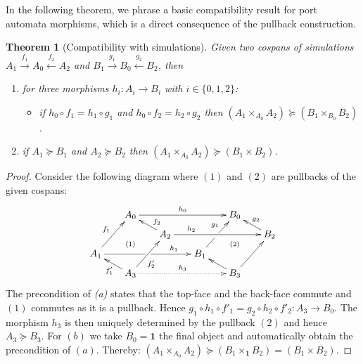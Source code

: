 \documentclass[copyright,creativecommons]{eptcs}
\newtheorem{theorem}{Theorem}
\newcommand{\one}{\ensuremath{\mathbf{1}}}
\begin{document}
In the following theorem, we phrase a basic compatibility result for port
automata morphisms, which is a direct consequence of the pullback construction.
\begin{theorem}[Compatibility with simulations]
Given two cospans of simulations $A_1 \overset{f_1}{\longrightarrow} A_0
\overset{f_2}{\longleftarrow} A_2$ and 
$B_1 \overset{g_1}{\longrightarrow} B_0 \overset{g_2}{\longleftarrow} B_2$,
then
\begin{enumerate}
  \item for three morphisms $h_i: A_i \to B_i$ with $i\in \{0,1,2\}$:
  \vspace{2mm}
  \begin{itemize} 
    \item if $h_0 \circ f_1 = h_1 \circ g_1$ and $h_0 \circ f_2 = h_2 \circ
    g_2$ then $\left( A_1 \times_{A_0} A_2 \right) \succeq \left( B_1
    \times_{B_0} B_2 \right)$.
  \end{itemize} 
  \vspace{2mm}
  \item if $A_1 \succeq B_1$ and $A_2 \succeq B_2$ then 
  $\left( A_1 \times_{A_0} A_2 \right) \succeq \left( B_1 \times B_2
  \right)$.
\end{enumerate}
\end{theorem}
\begin{proof}
Consider the following diagram where $(1)$ and $(2)$ are pullbacks of the given
cospans:
\vspace{-3mm}
\[
\xymatrix @C2mm @R2mm {
  && 
  A_0 \ar[rrrrrr]^{h_0} 
      &&&&&& 
  B_0 \\
      &&&&
  A_2 \ar[rrrrrr]^(0.25){h_2} 
      \ar[ull]_(.35){f_2} 
      \ar@{}[dllll]|{(1)} 
      &&&&&& 
  B_2 \ar[ull]_{g_2} 
      \ar@{}[dllll]|{(2)} 
      \\ 
  A_1 \ar'[rrr][rrrrrr]^(.5){h_1} 
      \ar[uurr]^{f_1} 
      &&&&&& 
  B_1 \ar'[ur][uurr] ^(.25){g_1} 
      \\ 
      && 
  A_3 \ar[uurr]_(.4){f_{2}'} 
      \ar@{.>}[rrrrrr]^{h_3} 
      \ar[ull]^{f_{1}'} 
      &&&&&& 
  B_3 \ar[ull] 
      \ar[uurr] 
      \\
}
\]
The precondition of \emph{(a)} states that the top-face and the back-face 
commute and $(1)$ commutes as it is a pullback. Hence $g_1 \circ h_1 \circ
f'_1 = g_2 \circ h_2 \circ f'_2 : A_3 \to B_0$. The morphism $h_3$ is then
uniquely determined by the pullback $(2)$ and hence $A_3 \succeq B_3$. 
For $(b)$ we take $B_0=\one$ the final object and automatically obtain
the precondition of $(a)$. Thereby:
$\left( A_1 \times_{A_0} A_2 \right) \succeq \left( B_1 \times_{\one} B_2
\right) = \left( B_1 \times B_2 \right)$.
\end{proof}
\end{document}
